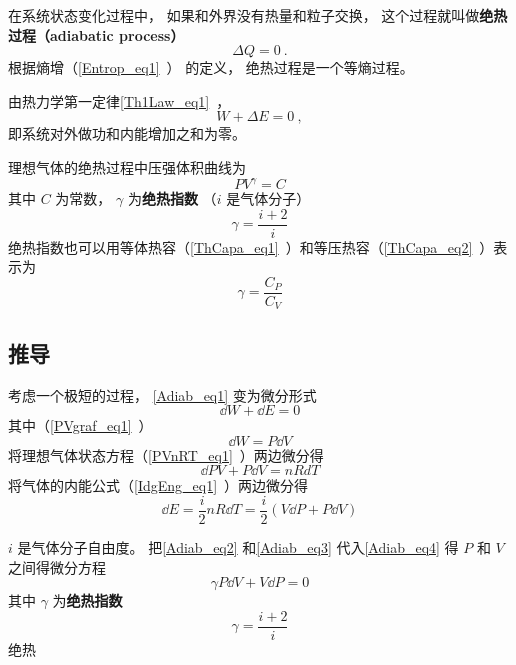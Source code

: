 

在系统状态变化过程中， 如果和外界没有热量和粒子交换， 这个过程就叫做\textbf{绝热过程（adiabatic process）}
\begin{equation}
\Delta Q = 0~.
\end{equation}
根据熵增（\autoref{Entrop_eq1}~） 的定义， 绝热过程是一个等熵过程。

由热力学第一定律\autoref{Th1Law_eq1}~，
\begin{equation}\label{Adiab_eq1}
W + \Delta E = 0~,
\end{equation}
即系统对外做功和内能增加之和为零。

理想气体的绝热过程中压强体积曲线为
\begin{equation}\label{Adiab_eq5}
P V^\gamma = C
\end{equation}
其中 $C$ 为常数， $\gamma$ 为\textbf{绝热指数} （$i$ 是气体分子）
\begin{equation}
\gamma = \frac{i+2}{i}
\end{equation}
绝热指数也可以用等体热容（\autoref{ThCapa_eq1}~）和等压热容（\autoref{ThCapa_eq2}~）表示为
\begin{equation}
\gamma = \frac{C_P}{C_V}
\end{equation}

\subsection{推导}
考虑一个极短的过程， \autoref{Adiab_eq1} 变为微分形式
\begin{equation}\label{Adiab_eq4}
\dd{W} + \dd{E} = 0
\end{equation}
其中（\autoref{PVgraf_eq1}~）
\begin{equation}\label{Adiab_eq2}
\dd{W} = P\dd{V}
\end{equation}
将理想气体状态方程（\autoref{PVnRT_eq1}~）两边微分得
\begin{equation}
\dd{P}V + P\dd{V} = nRdT
\end{equation}
将气体的内能公式（\autoref{IdgEng_eq1}~）两边微分得
\begin{equation}\label{Adiab_eq3}
\dd{E} = \frac{i}{2}n R\dd{T} = \frac{i}{2} (V\dd{P} + P\dd{V})
\end{equation}


$i$ 是气体分子自由度。 把\autoref{Adiab_eq2} 和\autoref{Adiab_eq3} 代入\autoref{Adiab_eq4} 得 $P$ 和 $V$ 之间得微分方程
\begin{equation}
\gamma P\dd{V} + V \dd{P} = 0
\end{equation}
其中 $\gamma$ 为\textbf{绝热指数}
\begin{equation}
\gamma = \frac{i+2}{i}
\end{equation}
绝热

